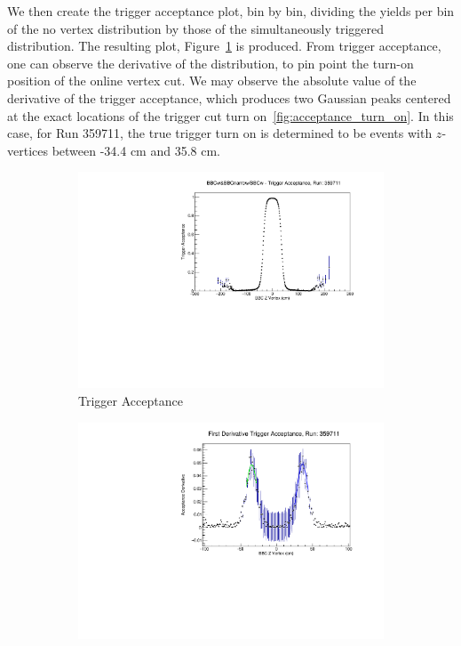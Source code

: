 We then create the trigger acceptance plot, bin by bin, dividing the yields per
bin of the no vertex distribution by those of the simultaneously triggered
distribution.  The resulting plot, Figure~\ref{fig:trigger_acceptance} is
produced. From trigger acceptance, one can observe the derivative of the
distribution, to pin point the turn-on position of the online vertex cut. We may
observe the absolute value of the derivative of the trigger acceptance, which
produces two Gaussian peaks centered at the exact locations of the trigger cut
turn on~\ref{fig:acceptance_turn_on}. In this case, for Run 359711, the true
trigger turn on is determined to be events with $z$-vertices between -34.4 cm
and 35.8 cm.

\begin{figure}
  \centering
  \begin{subfigure}[b]{0.7\linewidth}
    \includegraphics[width=\textwidth]{./figures/trigger_acceptance_359711.pdf}
    \caption{Trigger Acceptance}
    \label{fig:trigger_acceptance}
  \end{subfigure}
  \begin{subfigure}[b]{0.7\linewidth}
    \includegraphics[width=\textwidth]{./figures/trigger_acceptance_derivative.pdf}

\end{subfigure}
\end{figure}
